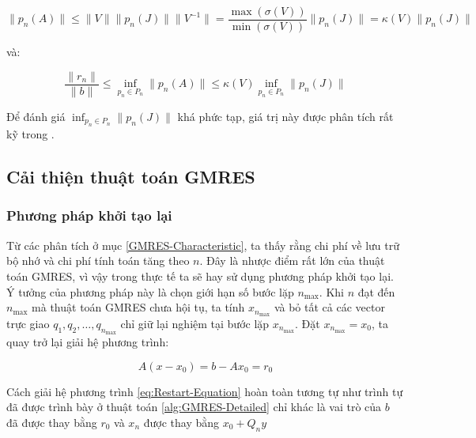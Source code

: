 \documentclass[14pt, a4paper]{article}
\numberwithin{equation}{section}
\numberwithin{algorithm}{section}
\numberwithin{figure}{section}
\numberwithin{dl}{section}
\numberwithin{md}{section}
\numberwithin{bd}{section}
\numberwithin{dn}{section}
\begin{document}
\begin{equation}
    \lVert p_n(A) \rVert \leq \lVert V \rVert \lVert p_n(J) \rVert \lVert V^{-1} \rVert=\dfrac{\max(\sigma(V))}{\min(\sigma(V))} \lVert p_n(J) \rVert = \kappa(V) \lVert p_n(J) \rVert
\end{equation}

và:

\begin{equation}
    \dfrac{\lVert r_n \rVert}{\lVert b \rVert} \leq \inf_{p_n \in P_n} \lVert p_n(A) \rVert \leq \kappa(V) \inf_{p_n \in P_n} \lVert p_n(J) \rVert
\end{equation}

Để đánh giá $\inf_{p_n \in P_n} \lVert p_n(J) \rVert$ khá phức tạp, giá trị này được phân tích rất kỹ trong \cite{tichy2005worst}.


\subsection{Cải thiện thuật toán GMRES}

\subsubsection{Phương pháp khởi tạo lại}

Từ các phân tích ở mục \ref{GMRES-Characteristic}, ta thấy rằng chi phí về lưu trữ bộ nhớ và chi phí tính toán tăng theo $n$. Đây là nhược điểm rất lớn của thuật toán GMRES, vì vậy trong thực tế ta sẽ hay sử dụng phương pháp khởi tạo lại.
Ý tưởng của phương pháp này là chọn giới hạn số bước lặp $n_{\max}$. Khi $n$ đạt đến $n_{\max}$ mà thuật toán GMRES chưa hội tụ, ta tính $x_{n_{\max}}$ và bỏ tất cả các vector trực giao $q_1, q_2, \dots, q_{n_{\max}}$ chỉ giữ lại nghiệm tại bước lặp $x_{n_{\max}}$. Đặt $x_{n_{\max}}=x_0$, ta quay trở lại giải hệ phương trình:

\begin{equation} \label{eq:Restart-Equation}
    A(x - x_0) = b - A x_0 = r_0
\end{equation}

Cách giải hệ phương trình \ref{eq:Restart-Equation} hoàn toàn tương tự như trình tự đã được trình bày ở thuật toán \ref{alg:GMRES-Detailed} chỉ khác là vai trò của $b$ đã được thay bằng $r_0$ và $x_n$ được thay bằng $x_0+Q_n y$
\end{document}
